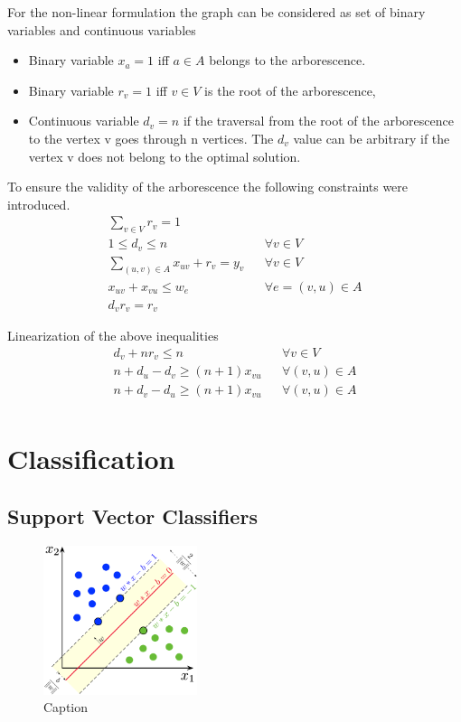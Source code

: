 \documentclass[msthesis.tex]{subfiles}
\begin{document}
For the non-linear formulation the graph can be considered as set of binary variables and continuous variables
\begin{itemize}
    \item Binary variable $x_a = 1$ iff $a \in A$ belongs to the arborescence.
    \item Binary variable $r_v = 1$ iff $v \in V$ is the root of the arborescence,
    \item Continuous variable $d_v = n$ if the traversal from the root of the arborescence to the vertex v goes through n vertices. The $d_v$ value can be arbitrary if the vertex v does not belong to the optimal solution.
\end{itemize}
To ensure the validity of the arborescence the following constraints were introduced. 
\begin{align}
    \sum_{v \in V} r_v = 1\\
    1 \leq d_v \leq n && \forall v \in V \\
    \sum_{(u,v) \in A} x_{uv} + r_v = y_v && \forall v \in V\\
    x_{uv} + x_{vu} \leq w_e && \forall e =(v,u) \in A\\
    d_v r_v = r_v
\end{align}

Linearization of the above inequalities
\begin{align}
    d_v + n r_v \leq n && \forall v \in V\\
    n + d_u - d_v \geq (n+1) x_{vu} && \forall (v,u) \in A\\
    n + d_v - d_u \geq (n+1) x_{vu} && \forall (v,u) \in A\\
\end{align}


\section{Classification}
\subsection{Support Vector Classifiers}
\begin{figure}
    \label{fig:svm}
    \centering
    \includegraphics[width=0.4\textwidth]{images/svm.png}
    \caption{Caption}
    \label{fig:my_label}
\end{figure}
\end{document}
